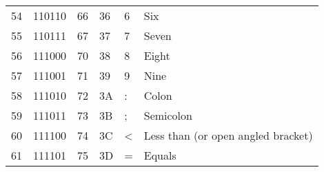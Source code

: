 \begin{center}
\begin{longtable}{llllll}
\rowcolor[HTML]{F3F6F6} 
{\color[HTML]{404040} 54}               & {\color[HTML]{404040} 110110}          & {\color[HTML]{404040} 66}             & {\color[HTML]{404040} 36}                   & {\color[HTML]{404040} 6}                  & {\color[HTML]{404040} Six}                                   \\
\rowcolor[HTML]{FCFCFC} 
{\color[HTML]{404040} 55}               & {\color[HTML]{404040} 110111}          & {\color[HTML]{404040} 67}             & {\color[HTML]{404040} 37}                   & {\color[HTML]{404040} 7}                  & {\color[HTML]{404040} Seven}                                 \\
\rowcolor[HTML]{F3F6F6} 
{\color[HTML]{404040} 56}               & {\color[HTML]{404040} 111000}          & {\color[HTML]{404040} 70}             & {\color[HTML]{404040} 38}                   & {\color[HTML]{404040} 8}                  & {\color[HTML]{404040} Eight}                                 \\
\rowcolor[HTML]{FCFCFC} 
{\color[HTML]{404040} 57}               & {\color[HTML]{404040} 111001}          & {\color[HTML]{404040} 71}             & {\color[HTML]{404040} 39}                   & {\color[HTML]{404040} 9}                  & {\color[HTML]{404040} Nine}                                  \\
\rowcolor[HTML]{F3F6F6} 
{\color[HTML]{404040} 58}               & {\color[HTML]{404040} 111010}          & {\color[HTML]{404040} 72}             & {\color[HTML]{404040} 3A}                   & {\color[HTML]{404040} :}                  & {\color[HTML]{404040} Colon}                                 \\
\rowcolor[HTML]{FCFCFC} 
{\color[HTML]{404040} 59}               & {\color[HTML]{404040} 111011}          & {\color[HTML]{404040} 73}             & {\color[HTML]{404040} 3B}                   & {\color[HTML]{404040} ;}                  & {\color[HTML]{404040} Semicolon}                             \\
\rowcolor[HTML]{F3F6F6} 
{\color[HTML]{404040} 60}               & {\color[HTML]{404040} 111100}          & {\color[HTML]{404040} 74}             & {\color[HTML]{404040} 3C}                   & {\color[HTML]{404040} \textless{}}        & {\color[HTML]{404040} Less than (or open angled bracket)}    \\
\rowcolor[HTML]{FCFCFC} 
{\color[HTML]{404040} 61}               & {\color[HTML]{404040} 111101}          & {\color[HTML]{404040} 75}             & {\color[HTML]{404040} 3D}                   & {\color[HTML]{404040} =}                  & {\color[HTML]{404040} Equals}                                \\

\end{longtable}
\end{center}
